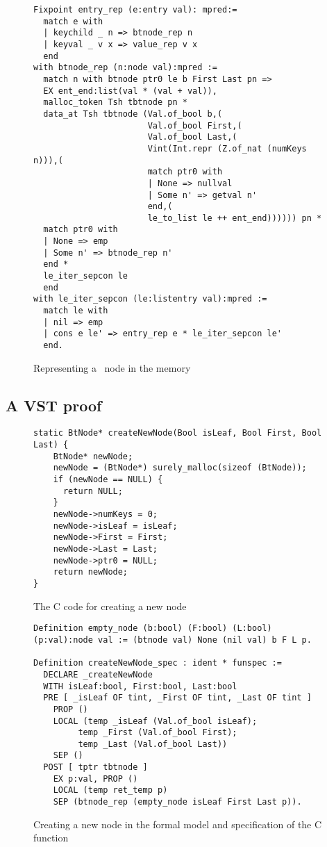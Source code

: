 \begin{figure}
\begin{lstlisting}[language=Coq]
Fixpoint entry_rep (e:entry val): mpred:=
  match e with
  | keychild _ n => btnode_rep n
  | keyval _ v x => value_rep v x
  end
with btnode_rep (n:node val):mpred :=
  match n with btnode ptr0 le b First Last pn =>
  EX ent_end:list(val * (val + val)),
  malloc_token Tsh tbtnode pn *
  data_at Tsh tbtnode (Val.of_bool b,(
                       Val.of_bool First,(
                       Val.of_bool Last,(
                       Vint(Int.repr (Z.of_nat (numKeys n))),(
                       match ptr0 with
                       | None => nullval
                       | Some n' => getval n'
                       end,(
                       le_to_list le ++ ent_end)))))) pn *
  match ptr0 with
  | None => emp
  | Some n' => btnode_rep n'
  end *
  le_iter_sepcon le
  end
with le_iter_sepcon (le:listentry val):mpred :=
  match le with
  | nil => emp
  | cons e le' => entry_rep e * le_iter_sepcon le'
  end.
\end{lstlisting}
\caption{Representing a \btree\ node in the memory}
\label{btnoderep}
\end{figure}

\newpage
\subsection{A VST proof}
\label{subsec:proof}
\begin{figure}
  \begin{lstlisting}
static BtNode* createNewNode(Bool isLeaf, Bool First, Bool Last) {
    BtNode* newNode;
    newNode = (BtNode*) surely_malloc(sizeof (BtNode));
    if (newNode == NULL) {
      return NULL;
    }
    newNode->numKeys = 0;
    newNode->isLeaf = isLeaf;
    newNode->First = First;
    newNode->Last = Last;
    newNode->ptr0 = NULL;
    return newNode;
}
  \end{lstlisting}
  \caption{The C code for creating a new node}
\end{figure}

\begin{figure}
  \begin{lstlisting}[language=Coq]
Definition empty_node (b:bool) (F:bool) (L:bool) (p:val):node val := (btnode val) None (nil val) b F L p.
    
Definition createNewNode_spec : ident * funspec :=
  DECLARE _createNewNode
  WITH isLeaf:bool, First:bool, Last:bool
  PRE [ _isLeaf OF tint, _First OF tint, _Last OF tint ]
    PROP ()
    LOCAL (temp _isLeaf (Val.of_bool isLeaf);
         temp _First (Val.of_bool First);
         temp _Last (Val.of_bool Last))
    SEP ()
  POST [ tptr tbtnode ]
    EX p:val, PROP ()
    LOCAL (temp ret_temp p)
    SEP (btnode_rep (empty_node isLeaf First Last p)).
  \end{lstlisting}
  \caption{Creating a new node in the formal model and specification of the C function}
\end{figure}

